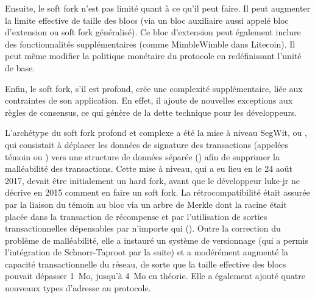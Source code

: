 Ensuite, le soft fork n'est pas limité quant à ce qu'il peut faire. Il peut augmenter la limite effective de taille des blocs (via un bloc auxiliaire aussi appelé bloc d'extension ou soft fork généralisé). Ce bloc d'extension peut également inclure des fonctionnalités supplémentaires (comme MimbleWimble dans Litecoin). Il peut même modifier la politique monétaire du protocole en redéfinissant l'unité de base.

Enfin, le soft fork, s'il est profond, crée une complexité supplémentaire, liée aux contraintes de son application. En effet, il ajoute de nouvelles exceptions aux règles de consensus, ce qui génère de la dette technique pour les développeurs.

L'archétype du soft fork profond et complexe a été la mise à niveau SegWit, ou , qui consistait à déplacer les données de signature des transactions (appelées témoin ou ) vers une structure de données séparée () afin de supprimer la malléabilité des transactions. Cette mise à niveau, qui a eu lieu en le 24 août 2017, devait être initialement un hard fork, avant que le développeur luke-jr ne décrive en 2015 comment en faire un soft fork. La rétrocompatibilité était assurée par la liaison du témoin au bloc via un arbre de Merkle dont la racine était placée dans la transaction de récompense et par l'utilisation de sorties transactionnelles dépensables par n'importe qui (). Outre la correction du problème de malléabilité, elle a instauré un système de versionnage (qui a permis l'intégration de Schnorr-Taproot par la suite) et a modérément augmenté la capacité transactionnelle du réseau, de sorte que la taille effective des blocs pouvait dépasser 1~Mo, jusqu'à 4~Mo en théorie. Elle a également ajouté quatre nouveaux types d'adresse au protocole.

